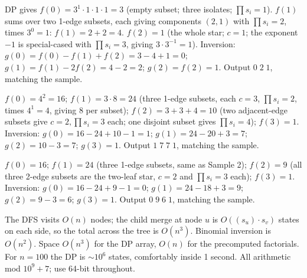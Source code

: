 \begin{tracebox}[Sample 1: \(n=3\) star \(1\!-\!2,\,1\!-\!3\)]
DP gives \(f(0)=3^{1}\cdot 1\cdot 1\cdot 1=3\) (empty subset; three isolates;
\(\prod s_i=1\)).  \(f(1)\) sums over two 1-edge subsets, each giving
components \((2,1)\) with \(\prod s_i=2\), times \(3^{0}=1\): \(f(1)=2+2=4\).
\(f(2)=1\) (the whole star; \(c=1\); the exponent \(-1\) is special-cased
with \(\prod s_i=3\), giving \(3\cdot 3^{-1}=1\)).  Inversion: \(g(0)=f(0)-f(1
)+f(2)=3-4+1=0\); \(g(1)=f(1)-2f(2)=4-2=2\); \(g(2)=f(2)=1\).  Output
\(0\;2\;1\), matching the sample.
\end{tracebox}
\begin{tracebox}[Sample 2: \(n=4\) path \(1\!-\!2,\,2\!-\!3,\,3\!-\!4\)]
\(f(0)=4^{2}=16\); \(f(1)=3\cdot 8=24\) (three 1-edge subsets, each \(c=3\), \(\prod s_i=2\), times \(4^{1}=4\), giving \(8\) per subset); \(f(2)=
3+3+4=10\) (two adjacent-edge subsets give \(c=2,\prod s_i=3\) each; one
disjoint subset gives \(\prod s_i=4\)); \(f(3)=1\).  Inversion: \(g(0
)=16-24+10-1=1\); \(g(1)=24-20+3=7\); \(g(2)=10-3=7\); \(g(3)=1\).  Output \(1\;7\;7\;1\),
matching the sample.
\end{tracebox}
\begin{tracebox}[Sample 3: \(n=4\) star \(1\!-\!2,\,1\!-\!3,\,1\!-\!4\)]
\(f(0)=16\); \(f(1)=24\) (three 1-edge subsets, same as Sample 2); \(f(2
)=9\) (all three 2-edge subsets are the two-leaf star, \(c=2\) and \(\prod s_i=3\) each); \(f(3)=1\).  Inversion: \(g(0)=16-24+9-1=0\); \(g(1)=24-18+3=9\); \(g(2)=9-3=6\); \(g(3)=1\).  Output
\(0\;9\;6\;1\), matching the sample.
\end{tracebox}

\begin{complexitybox}
The DFS visits \(O(n)\) nodes; the child merge at node \(u\) is \(O((s_u)\cdot s_v)\) states on each side, so the total across the tree is
\(O(n^3)\).  Binomial inversion is \(O(n^2)\).  Space \(O(n^3)\) for the
DP array, \(O(n)\) for the precomputed factorials.  For \(n=100\) the
DP is \(\sim 10^6\) states, comfortably inside 1 second.  All arithmetic
mod \(10^9+7\); use 64-bit throughout.
\end{complexitybox}

